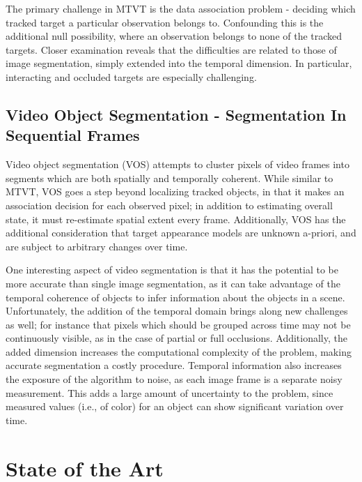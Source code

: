 
The primary challenge in MTVT is the data association problem - deciding which tracked target a particular observation belongs to. Confounding this is the additional null possibility, where an observation belongs to none of the tracked targets. Closer examination reveals that the difficulties are related to those of image segmentation, simply extended into the temporal dimension. In particular, interacting and occluded targets are especially challenging.

\subsection{Video Object Segmentation - Segmentation In Sequential Frames}
Video object segmentation (VOS) attempts to cluster pixels of video frames into segments which are both spatially and temporally coherent. While similar to MTVT, VOS goes a step beyond localizing tracked objects, in that it makes an association decision for each observed pixel; in addition to estimating overall state, it must re-estimate spatial extent every frame. Additionally, VOS has the additional consideration that target appearance models are unknown a-priori, and are subject to arbitrary changes over time. 


One interesting aspect of video segmentation is that it has the potential to be more accurate than single image segmentation, as it can take advantage of the temporal coherence of objects to infer information about the objects in a scene. Unfortunately, the addition of the temporal domain brings along new challenges as well; for instance that pixels which should be grouped across time may not be continuously visible, as in the case of partial or full occlusions. Additionally, the added dimension increases the computational complexity of the problem, making accurate segmentation a costly procedure. Temporal information also increases the exposure of the algorithm to noise, as each image frame is a separate noisy measurement. This adds a large amount of uncertainty to the problem, since measured values (i.e., of color) for an object can show significant variation over time. 
 
\section{State of the Art}
